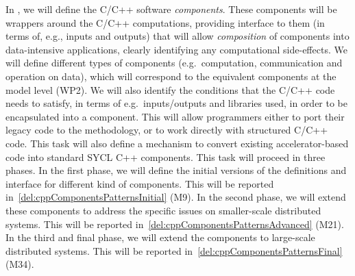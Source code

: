 \begin{Workpackage}{\thewpno}
\begin{Task}
\TaskResults{
\ref{del:cppComponentsPatternsInitial}
\ref{del:cppComponentsPatternsAdvanced}
\ref{del:cppComponentsPatternsFinal}
}
\TaskHeader{}
In \theTask, we will define the \TheProject{} C/C++ software \emph{components}. These components will be wrappers around 
the C/C++ computations, providing interface to them (in terms of, e.g., inputs and outputs) 
that will allow \emph{composition} of components into data-intensive applications, clearly identifying any 
computational side-effects. We will define different types of components (e.g.~computation, 
communication and operation on data), which will correspond to the equivalent components at the model 
level (WP2). We will also identify the conditions that the C/C++ code needs to satisfy, in terms of 
e.g.~inputs/outputs and libraries used, in order to be encapsulated into a \TheProject{} 
component. This will allow programmers either to port their legacy code to the \TheProject{} methodology,
or to work directly with structured C/C++ code. This task will also define a mechanism to convert existing accelerator-based code into standard SYCL C++  \TheProject{} components. This task will proceed in three phases. In the first phase,
we will define the initial versions of the definitions and interface for different kind of components. This will be reported in~\ref{del:cppComponentsPatternsInitial} (M9).
In the second phase, we will extend these components to address the specific
issues on smaller-scale distributed systems. This will be reported in~\ref{del:cppComponentsPatternsAdvanced} (M21). In the third and final phase, 
we will extend the components to large-scale distributed systems. This will be reported in~\ref{del:cppComponentsPatternsFinal} (M34).
\end{Task}


\end{Workpackage}
